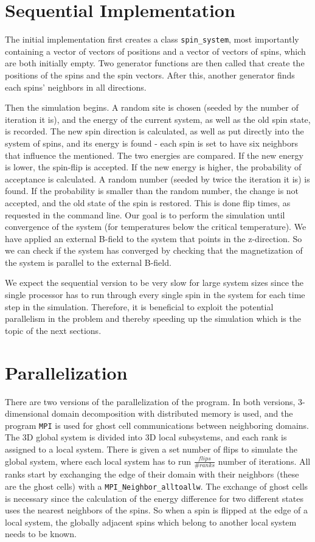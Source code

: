 \documentclass{article}
\begin{document}
\section{Sequential Implementation} \label{sec:seq_imp}
The initial implementation first creates a class \verb|spin_system|, most importantly containing a vector of vectors of positions and a vector of vectors of spins, which are both initially empty. Two generator functions are then called that create the positions of the spins and the spin vectors. After this, another generator finds each spins' neighbors in all directions.

Then the simulation begins. A random site is chosen (seeded by the number of iteration it is), and the energy of the current system, as well as the old spin state, is recorded. The new spin direction is calculated, as well as put directly into the system of spins, and its energy is found - each spin is set to have six neighbors that influence the mentioned. The two energies are compared. If the new energy is lower, the spin-flip is accepted. If the new energy is higher, the probability of acceptance is calculated. A random number (seeded by twice the iteration it is) is found. If the probability is smaller than the random number, the change is not accepted, and the old state of the spin is restored. This is done flip times, as requested in the command line. Our goal is to perform the simulation until convergence of the system (for temperatures below the critical temperature). We have applied an external B-field to the system that points in the z-direction. So we can check if the system has converged by checking that the magnetization of the system is parallel to the external B-field.

We expect the sequential version to be very slow for large system sizes since the single processor has to run through every single spin in the system for each time step in the simulation. Therefore, it is beneficial to exploit the potential parallelism in the problem and thereby speeding up the simulation which is the topic of the next sections.

\section{Parallelization}
There are two versions of the parallelization of the program. In both versions, 3-dimensional domain decomposition with distributed memory is used, and the program \texttt{MPI} is used for ghost cell communications between neighboring domains. The 3D global system is divided into 3D local subsystems, and each rank is assigned to a local system. There is given a set number of flips to simulate the global system, where each local system has to run $\frac{flips}{\#ranks}$ number of iterations. All ranks start by exchanging the edge of their domain with their neighbors (these are the ghost cells) with a \texttt{MPI\_Neighbor\_alltoallw}. The exchange of ghost cells is necessary since the calculation of the energy difference for two different states uses the nearest neighbors of the spins. So when a spin is flipped at the edge of a local system, the globally adjacent spins which belong to another local system needs to be known.
\end{document}

